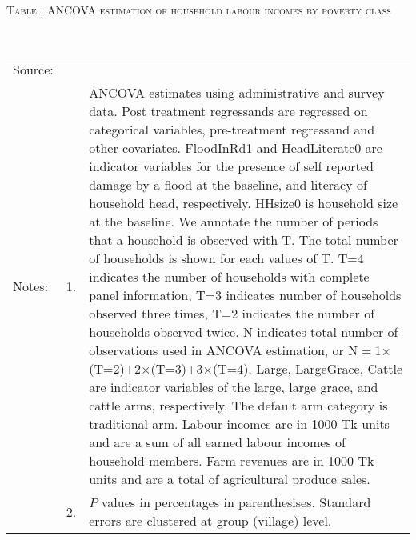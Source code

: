 \hspace{-1cm}\begin{minipage}[t]{14cm}
\hfil\textsc{\normalsize Table \thetable: ANCOVA estimation of household labour incomes by poverty class\label{tab LabourIncomeTimeVaryingANCOVA}}\\
\setlength{\tabcolsep}{.5pt}
\setlength{\baselineskip}{8pt}
\renewcommand{\arraystretch}{.55}

\hfil{}\\

\renewcommand{\arraystretch}{.8}
\setlength{\tabcolsep}{1pt}
\begin{tabular}{>{\hfill\scriptsize}p{1cm}<{}>{\hfill\scriptsize}p{.25cm}<{}>{\scriptsize}p{12cm}<{\hfill}}
Source:& \multicolumn{2}{l}{\scriptsize Estimated with GUK administrative and survey data.}\\
Notes: & 1. & ANCOVA estimates using administrative and survey data. Post treatment regressands are regressed on categorical variables, pre-treatment regressand and other covariates. \textsf{FloodInRd1} and \textsf{HeadLiterate0} are indicator variables for the presence of self reported damage by a flood at the baseline, and literacy of household head, respectively. \textsf{HHsize0} is household size at the baseline. We annotate the number of periods that a household is observed with \textsf{T}. The total number of households is shown for each values of \textsf{T}. \textsf{T=4} indicates the number of households with complete panel information, \textsf{T=3} indicates number of households observed three times, \textsf{T=2} indicates the number of households observed twice. \textsf{N} indicates total number of observations used in ANCOVA estimation, or \textsf{N$=$1$\times$(T=2)+2$\times$(T=3)+3$\times$(T=4)}.  \textsf{Large}, \textsf{LargeGrace}, \textsf{Cattle} are indicator variables of the \textsf{large}, \textsf{large grace}, and \textsf{cattle} arms, respectively. The default arm category is \textsf{traditional} arm. Labour incomes are in 1000 Tk units and are a sum of all earned labour incomes of household members. Farm revenues are in 1000 Tk units and are a total of agricultural produce sales.  \\
& 2. & $P$ values in percentages in parenthesises. Standard errors are clustered at group (village) level.
\end{tabular}
\end{minipage}


